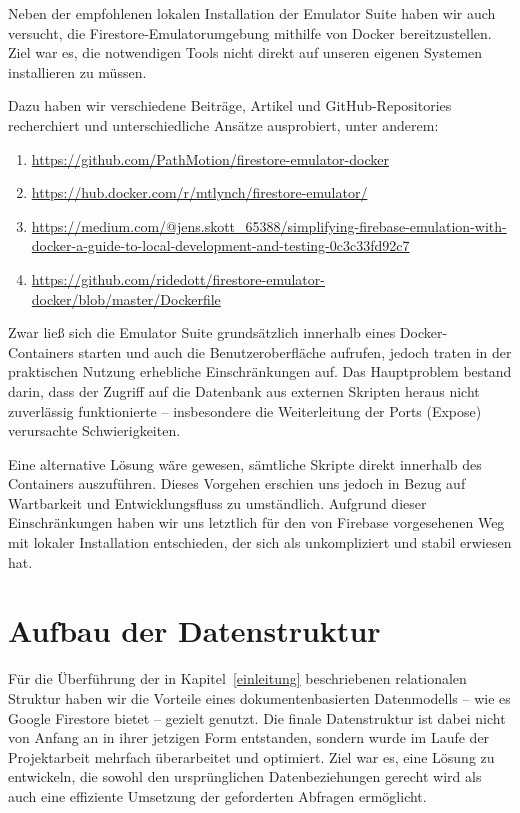 \documentclass[12pt,a4paper%
              ,oneside     %
              ,titlepage
              ,DIV=13
              ,headinclude
              ,footinclude=false%
              ,cleardoublepage=empty%
              ,parskip=half,
              BCOR=0mm,
              ]{scrreprt}
\begin{document}
Neben der empfohlenen lokalen Installation der Emulator Suite haben wir auch versucht, die Firestore-Emulatorumgebung mithilfe von Docker bereitzustellen. Ziel war es, die notwendigen Tools nicht direkt auf unseren eigenen Systemen installieren zu müssen.

Dazu haben wir verschiedene Beiträge, Artikel und GitHub-Repositories recherchiert und unterschiedliche Ansätze ausprobiert, unter anderem:

\begin{enumerate}
	\item \url{https://github.com/PathMotion/firestore-emulator-docker}
	\item \url{https://hub.docker.com/r/mtlynch/firestore-emulator/}
	\item \url{https://medium.com/@jens.skott_65388/simplifying-firebase-emulation-with-docker-a-guide-to-local-development-and-testing-0c3c33fd92c7}
	\item \url{https://github.com/ridedott/firestore-emulator-docker/blob/master/Dockerfile}
\end{enumerate}

Zwar ließ sich die Emulator Suite grundsätzlich innerhalb eines Docker-Containers starten und auch die Benutzeroberfläche aufrufen, jedoch traten in der praktischen Nutzung erhebliche Einschränkungen auf. Das Hauptproblem bestand darin, dass der Zugriff auf die Datenbank aus externen Skripten heraus nicht zuverlässig funktionierte – insbesondere die Weiterleitung der Ports (Expose) verursachte Schwierigkeiten.

Eine alternative Lösung wäre gewesen, sämtliche Skripte direkt innerhalb des Containers auszuführen. Dieses Vorgehen erschien uns jedoch in Bezug auf Wartbarkeit und Entwicklungsfluss zu umständlich. Aufgrund dieser Einschränkungen haben wir uns letztlich für den von Firebase vorgesehenen Weg mit lokaler Installation entschieden, der sich als unkompliziert und stabil erwiesen hat.

\chapter{Aufbau der Datenstruktur}
\label{struktur-chapter}

Für die Überführung der in Kapitel~\ref{einleitung} beschriebenen relationalen Struktur haben wir die Vorteile eines dokumentenbasierten Datenmodells – wie es Google Firestore bietet – gezielt genutzt. Die finale Datenstruktur ist dabei nicht von Anfang an in ihrer jetzigen Form entstanden, sondern wurde im Laufe der Projektarbeit mehrfach überarbeitet und optimiert. Ziel war es, eine Lösung zu entwickeln, die sowohl den ursprünglichen Datenbeziehungen gerecht wird als auch eine effiziente Umsetzung der geforderten Abfragen ermöglicht.
\end{document}
